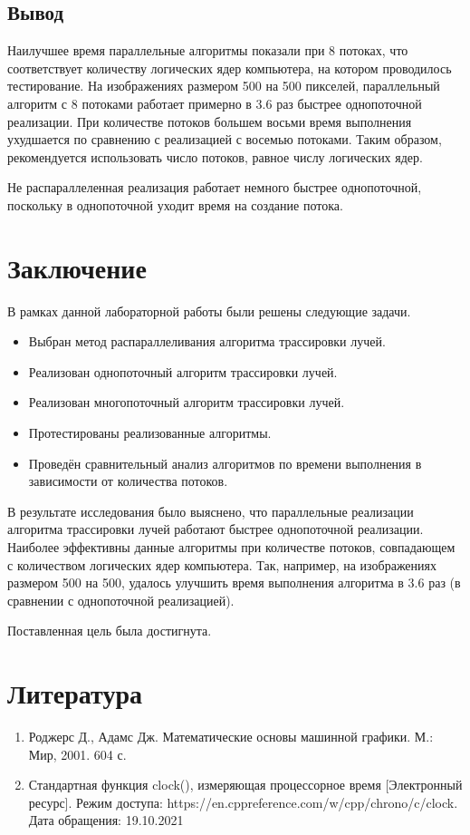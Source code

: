 \documentclass[12pt]{report}
\begin{document}
\section{Вывод}

Наилучшее время параллельные алгоритмы показали при 8 потоках, что соответствует количеству логических ядер компьютера, на котором проводилось тестирование. На изображениях размером 500 на 500 пикселей, параллельный алгоритм с 8 потоками работает примерно в 3.6 раз быстрее однопоточной реализации. При количестве потоков большем восьми время выполнения ухудшается по сравнению с реализацией с восемью потоками. Таким образом, рекомендуется использовать число потоков, равное числу логических ядер.

Не распараллеленная реализация работает немного быстрее однопоточной, поскольку в однопоточной уходит время на создание потока.
\chapter*{Заключение}

В рамках данной лабораторной работы были решены следующие задачи.

\begin{itemize}
    \item Выбран метод распараллеливания алгоритма трассировки лучей.
	\item Реализован однопоточный алгоритм трассировки лучей.
	\item Реализован многопоточный алгоритм трассировки лучей.
	\item Протестированы реализованные алгоритмы.
	\item Проведён сравнительный анализ алгоритмов по времени выполнения в зависимости от количества потоков.
\end{itemize}

В результате исследования было выяснено, что параллельные реализации алгоритма трассировки лучей работают быстрее однопоточной реализации. Наиболее эффективны данные алгоритмы при количестве потоков, совпадающем с количеством логических ядер компьютера. Так, например, на изображениях размером 500 на 500, удалось улучшить время выполнения алгоритма в 3.6 раз (в сравнении с однопоточной реализацией).

Поставленная цель была достигнута.

\chapter*{Литература}
\begin{enumerate}
    \item Роджерс Д., Адамс Дж. Математические основы машинной графики. М.: Мир, 2001. 604 с.
	\item Стандартная функция clock(), измеряющая процессорное время [Электронный ресурс]. Режим доступа: https://en.cppreference.com/w/cpp/chrono/c/clock. Дата обращения: 19.10.2021
	
\end{enumerate}
\end{document}
